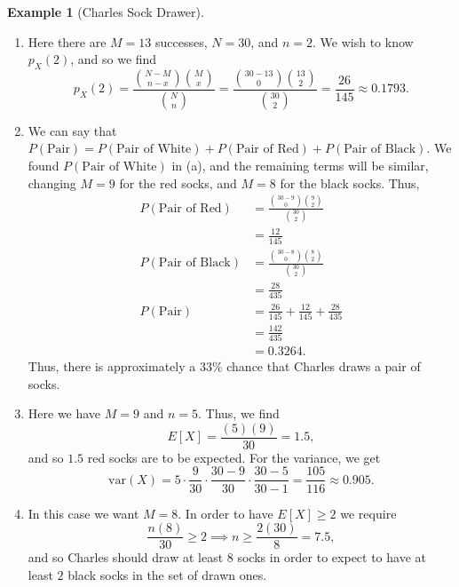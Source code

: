 \documentclass[
  letterpaper,
  DIV=11,
  numbers=noendperiod]{scrreprt}
\providecommand{\tightlist}{%
  \setlength{\itemsep}{0pt}\setlength{\parskip}{0pt}}\usepackage{longtable,booktabs,array}
\theoremstyle{definition}
\theoremstyle{definition}
\newtheorem{example}{Example}[chapter]
\theoremstyle{definition}
\theoremstyle{remark}
\begin{document}
\begin{example}[Charles Sock
Drawer]
\begin{tcolorbox}[enhanced jigsaw, colback=white, colframe=quarto-callout-color-frame, arc=.35mm, leftrule=.75mm, rightrule=.15mm, opacityback=0, breakable, bottomrule=.15mm, left=2mm, toprule=.15mm]
\begin{enumerate}
\def\labelenumi{\alph{enumi}.}
\tightlist
\item
  Here there are \(M=13\) successes, \(N=30\), and \(n=2\). We wish to
  know \(p_X(2)\), and so we find
  \[p_X(2) = \frac{\binom{N-M}{n-x}\binom{M}{x}}{\binom{N}{n}} = \frac{\binom{30-13}{0}\binom{13}{2}}{\binom{30}{2}} = \frac{26}{145} \approx 0.1793.\]
\item
  We can say that
  \(P(\text{Pair}) = P(\text{Pair of White}) + P(\text{Pair of Red}) + P(\text{Pair of Black})\).
  We found \(P(\text{Pair of White})\) in (a), and the remaining terms
  will be similar, changing \(M=9\) for the red socks, and \(M=8\) for
  the black socks. Thus, \begin{align*}
   P(\text{Pair of Red}) &= \frac{\binom{30-9}{0}\binom{9}{2}}{\binom{30}{2}} \\
   &= \frac{12}{145} \\
   P(\text{Pair of Black}) &= \frac{\binom{30-8}{0}\binom{8}{2}}{\binom{30}{2}} \\
   &= \frac{28}{435} \\
   P(\text{Pair}) &= \frac{26}{145} + \frac{12}{145} + \frac{28}{435} \\
   &= \frac{142}{435} \\
   &= 0.3264.
  \end{align*} Thus, there is approximately a \(33\%\) chance that
  Charles draws a pair of socks.
\item
  Here we have \(M=9\) and \(n=5\). Thus, we find
  \[E[X] = \frac{(5)(9)}{30} = 1.5,\] and so \(1.5\) red socks are to be
  expected.\footnotemark{} For the variance, we get
  \[\text{var}(X) = 5\cdot\frac{9}{30}\cdot\frac{30-9}{30}\cdot\frac{30-5}{30-1} = \frac{105}{116} \approx 0.905.\]
\item
  In this case we want \(M=8\). In order to have \(E[X] \geq 2\) we
  require
  \[\frac{n(8)}{30} \geq 2 \implies n \geq \frac{2(30)}{8} = 7.5,\] and
  so Charles should draw at least \(8\) socks in order to expect to have
  at least \(2\) black socks in the set of drawn ones.
\end{enumerate}

\end{tcolorbox}


\end{example}
\end{document}
